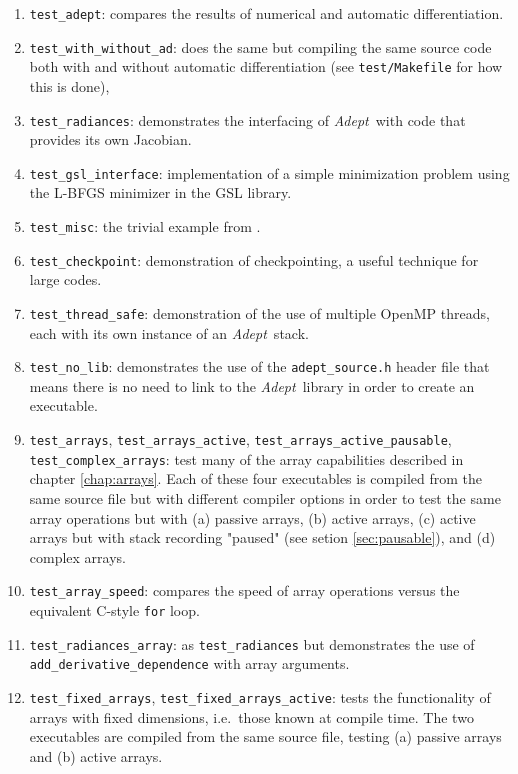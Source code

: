 \documentclass[a4,oneside]{book}
\def\codesize{\small}
\def\Adept{\emph{Adept}}
\def\code#1{{\codesize\texttt{#1}}}
\begin{document}
\begin{enumerate}
\item\code{test\_adept}: compares the results of numerical and
  automatic differentiation.
\item\code{test\_with\_without\_ad}: does the same but compiling the
  same source code both with and without automatic differentiation
  (see \code{test/Makefile} for how this is done),
\item\code{test\_radiances}: demonstrates the interfacing of
  \Adept\ with code that provides its own Jacobian.
\item\code{test\_gsl\_interface}: implementation of a simple minimization
  problem using the L-BFGS minimizer in the GSL library.
\item\code{test\_misc}: the trivial example from \cite{Hogan2014}.
\item\code{test\_checkpoint}: demonstration of checkpointing, a useful
  technique for large codes.
\item\code{test\_thread\_safe}: demonstration of the use of multiple
  OpenMP threads, each with its own instance of an \Adept\ stack.
\item\code{test\_no\_lib}: demonstrates the use of the
  \code{adept\_source.h} header file that means there is no need to
  link to the \Adept\ library in order to create an executable.
\item\code{test\_arrays}, \code{test\_arrays\_active},
  \code{test\_arrays\_active\_pausable}, \code{test\_complex\_arrays}:
  test many of the array capabilities described in chapter
  \ref{chap:arrays}. Each of these four executables is compiled from
  the same source file but with different compiler options in order to
  test the same array operations but with (a) passive arrays, (b)
  active arrays, (c) active arrays but with stack recording "paused"
  (see setion \ref{sec:pausable}), and (d) complex arrays.
\item\code{test\_array\_speed}: compares the speed of array operations
  versus the equivalent C-style \code{for} loop.
\item\code{test\_radiances\_array}: as \code{test\_radiances} but
  demonstrates the use of \code{add\_derivative\_dependence} with
  array arguments.
\item\code{test\_fixed\_arrays}, \code{test\_fixed\_arrays\_active}:
  tests the functionality of arrays with fixed dimensions, i.e.\ those
  known at compile time. The two executables are compiled from the
  same source file, testing (a) passive arrays and (b) active arrays.

\end{enumerate}
\end{document}
